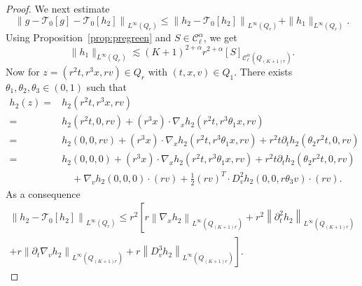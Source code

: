 \documentclass[AHL,Unicode,longabstracts,published]{cedram}
\newcommand{\cC}{\mathcal{C}}
\newcommand{\cT}{\mathcal{T}}
\begin{document}
\begin{proof}
We next estimate
\begin{equation}\label{eq:start}
\left\| g - \cT_{0}[g] - \cT_{0}[h_2] \right\|_{L^\infty(Q_r)} \le \left\| h_2 - \cT_{0}[h_2] \right\|_{L^\infty(Q_r)} + \| h_1\|_{L^\infty(Q_r)}.
\end{equation}
Using Proposition~\ref{prop:pregreen} and $S \in \cC^\alpha_\ell$, we get
\begin{equation}\label{eq:g}
\| h_1 \|_{L^\infty(Q_r)} \lesssim (K+1)^{2+\alpha} r^{2+\alpha} [S]_{\cC_\ell^{\alpha}\left(Q_{(K+1)r}\right)}.
\end{equation}
Now for $z = (r^2 t, r^3 x, rv) \in Q_r$ with $(t,x,v) \in Q_1$. There exists $\theta_1, \theta_2, \theta_3 \in (0,1)$ such that
\begin{align*}
h_2(z) = & h_2\left(r^2 t, r^3 x, rv\right) \\
= & h_2\left(r^2 t, 0, rv\right) + \left(r^3 x\right) \cdot \nabla_x h_2 \left(r^2t,r^3 \theta_1 x,r v\right) \\
= & h_2(0, 0, rv) + \left(r^3 x\right) \cdot \nabla_x h_2 \left(r^2t,r^3 \theta_1 x,r v\right) + r^2t \partial_t h_2 \left(\theta_2 r^2 t, 0,r v\right) \\
= & h_2(0,0,0) + \left(r^3 x\right) \cdot \nabla_x h_2 \left(r^2t,r^3 \theta_1 x,r v\right) + r^2t \partial_t h_2 \left(\theta_2 r^2 t, 0,r v\right) \\
& \quad + \nabla_v h_2(0,0,0) \cdot (rv) + \frac12 (rv) ^T \cdot D^2_v h_2(0,0, r \theta_3 v) \cdot (rv).
\end{align*}
As a consequence
\begin{multline*}
\left\| h_2 - \cT_{0}[h_2]\right\|_{L^\infty(Q_r)} \le r^2 \left[r \left\|\nabla_x h_2\right\|_{L^\infty\left(Q_{(K+1)r}\right)} + r^2 \left\|\partial^2_t h_2\right\|_{L^\infty\left(Q_{(K+1)r}\right)}\right. \\
+\left. r \left\|\partial_t \nabla_v h_2 \right\|_{L^\infty\left(Q_{(K+1)r}\right)} + r \left\| D^3_v h_2 \right\|_{L^\infty\left(Q_{(K+1)r}\right)} \right].
\end{multline*}


\end{proof}
\end{document}
